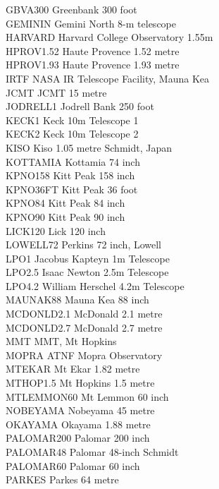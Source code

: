 \documentclass[11pt,twoside]{article}
\begin{document}
{\begin{tabbing}
GBVA300 \> Greenbank 300 foot \\
GEMININ \> Gemini North 8-m telescope \\
HARVARD \> Harvard College Observatory 1.55m \\
HPROV1.52 \> Haute Provence 1.52 metre \\
HPROV1.93 \> Haute Provence 1.93 metre \\
IRTF \> NASA IR Telescope Facility, Mauna Kea \\
JCMT \> JCMT 15 metre \\
JODRELL1 \> Jodrell Bank 250 foot \\
KECK1 \> Keck 10m Telescope 1 \\
KECK2 \> Keck 10m Telescope 2 \\
KISO \> Kiso 1.05 metre Schmidt, Japan \\
KOTTAMIA \> Kottamia 74 inch \\
KPNO158 \> Kitt Peak 158 inch \\
KPNO36FT \> Kitt Peak 36 foot \\
KPNO84 \> Kitt Peak 84 inch \\
KPNO90 \> Kitt Peak 90 inch \\
LICK120 \> Lick 120 inch \\
LOWELL72 \> Perkins 72 inch, Lowell \\
LPO1 \> Jacobus Kapteyn 1m Telescope \\
LPO2.5 \> Isaac Newton 2.5m Telescope \\
LPO4.2 \> William Herschel 4.2m Telescope \\
MAUNAK88 \> Mauna Kea 88 inch \\
MCDONLD2.1 \> McDonald 2.1 metre \\
MCDONLD2.7 \> McDonald 2.7 metre \\
MMT \> MMT, Mt Hopkins \\
MOPRA \> ATNF Mopra Observatory \\
MTEKAR \> Mt Ekar 1.82 metre \\
MTHOP1.5 \> Mt Hopkins 1.5 metre \\
MTLEMMON60 \> Mt Lemmon 60 inch \\
NOBEYAMA \> Nobeyama 45 metre \\
OKAYAMA \> Okayama 1.88 metre \\
PALOMAR200 \> Palomar 200 inch \\
PALOMAR48 \> Palomar 48-inch Schmidt \\
PALOMAR60 \> Palomar 60 inch \\
PARKES \> Parkes 64 metre \\

\end{tabbing}}
\end{document}
